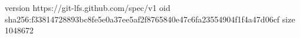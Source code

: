 version https://git-lfs.github.com/spec/v1
oid sha256:f33814728893bc8fe5e0a37ee5af2f8765840e47c6fa23554904f1f4a47d06cf
size 1048672
